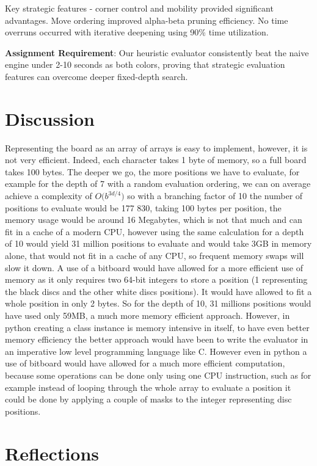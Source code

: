 \documentclass[10pt, titlepage, oneside, a4paper]{article}
\begin{document}
Key strategic features - corner control and mobility provided significant advantages. Move ordering improved alpha-beta pruning efficiency. No time overruns occurred with iterative deepening using 90\% time utilization.

\textbf{Assignment Requirement}: Our heuristic evaluator consistently beat the naive engine under 2-10 seconds as both colors, proving that strategic evaluation features can overcome deeper fixed-depth search.

\section{Discussion}
\label{sec:discussion}
Representing the board as an array of arrays is easy to implement, however, it is not very efficient. Indeed, each character takes 1 byte of memory, so a full board takes 100 bytes. 
The deeper we go, the more positions we have to evaluate, for example for the depth of 7 with a random evaluation ordering, we can on average achieve a complexity of $O\big(b^{3d/4}\big)$ \textcite{alpha_beta_complexity} so with a branching factor of 10 the number of positions to evaluate would be 177 830, taking 100 bytes per position, the memory usage would be around 16 Megabytes, which is not that much and can fit in a cache of a modern CPU, however using the same calculation for a depth of 10 would yield 31 million positions to evaluate and would take 3GB in memory alone, that would not fit in a cache of any CPU, so frequent memory swaps will slow it down. 
A use of a bitboard would have allowed for a more efficient use of memory as it only requires two 64-bit integers to store a position (1 representing the black discs and the other white discs positions). It would have allowed to fit a whole position in only 2 bytes. So for the depth of 10, 31 millions positions would have used only 59MB, a much more memory efficient approach.
However, in python creating a class instance is memory intensive in itself, to have even better memory efficiency the better approach would have been to write the evaluator in an imperative low level programming language like C.
However even in python a use of bitboard would have allowed for a much more efficient computation, because some operations can be done only using one CPU instruction, such as for example instead of looping through the whole array to evaluate a position it could be done by applying a couple of masks to the integer representing disc positions.  


\section{Reflections}
\label{sec:reflections}
\end{document}
